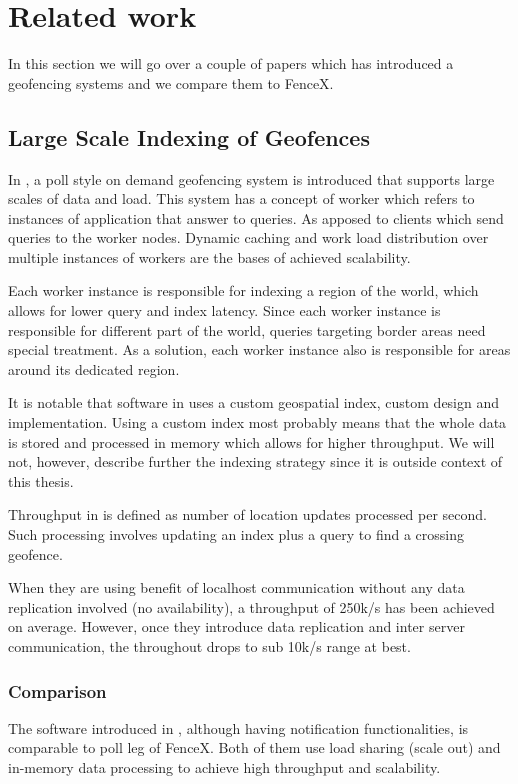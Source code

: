 \documentclass[a4]{report}
\begin{document}
    \clearpage


    \section{Related work}
    In this section we will go over a couple of papers which has introduced a geofencing systems and we compare them
    to FenceX.

    \subsection{Large Scale Indexing of Geofences}
    In \cite{Cirillo-Jacobs-Martin-Szczytowski-2014}, a poll style on demand geofencing system is introduced that supports large scales
    of data and load.
    This system has a concept of worker which refers to instances of application that answer to queries.
    As apposed to clients which send queries to the worker nodes.
    Dynamic caching and work load distribution over multiple instances of workers are the bases of achieved
    scalability.

    Each worker instance is responsible for indexing a region of the world, which allows for lower query and index latency.
    Since each worker instance is responsible for different part of the world, queries targeting border areas need
    special treatment.
    As a solution, each worker instance also is responsible for areas around its dedicated region.

    It is notable that software in \cite{Cirillo-Jacobs-Martin-Szczytowski-2014} uses a custom geospatial index,
    custom design and implementation.
    Using a custom index most probably means that the whole data is stored and processed in memory which allows for higher throughput.
    We will not, however, describe further the indexing strategy since it is outside context of this thesis.

    Throughput in \cite{Cirillo-Jacobs-Martin-Szczytowski-2014} is defined as number of location updates processed per second.
    Such processing involves updating an index plus a query to find a crossing geofence.

    When they are using benefit of localhost communication without any data replication involved (no availability), a
    throughput of 250k/s has been achieved on average.
    However, once they introduce data replication and inter server communication, the throughout drops to sub 10k/s
    range at best.

    \subsubsection{Comparison}
    The software introduced in \cite{Cirillo-Jacobs-Martin-Szczytowski-2014}, although having notification
    functionalities, is comparable to poll leg of FenceX.
    Both of them use load sharing (scale out) and in-memory data processing to achieve high throughput and
    scalability.
\end{document}
